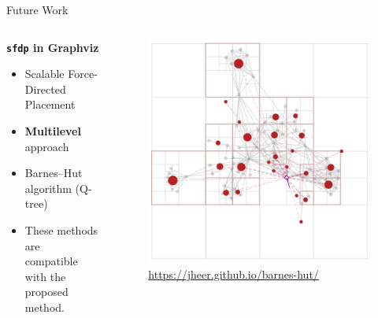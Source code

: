 \documentclass[dvipdfmx,13pt,aspectratio=169]{beamer}
\newif\ifShowHidden
\begin{document}
\ifShowHidden
  \begin{frame}{Future Work}
    \begin{columns}
      \begin{column}{0.4\columnwidth}
        \textbf{\texttt{sfdp} in Graphviz}
        \begin{itemize}
          \item Scalable Force-Directed Placement
          \item \textbf{Multilevel} approach
          \item Barnes--Hut algorithm (Q-tree)\cite{Hu2006EfficientHF}
                \cite{barnesHierarchicalLogForcecalculation1986}
          \item These methods are\\compatible with the proposed method.
        \end{itemize}
      \end{column}
      \begin{column}{0.6\columnwidth}
        \begin{figure}[htbp]
          \centering
          \includegraphics[width=0.7\columnwidth]{imgs/BH.png}
          \caption{\footnotesize{\url{https://jheer.github.io/barnes-hut/}}}
        \end{figure}
      \end{column}
    \end{columns}


  \end{frame}
\end{document}
